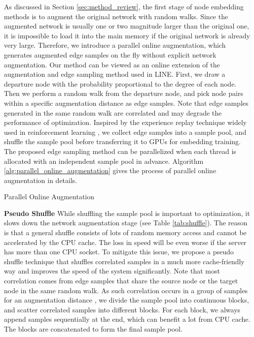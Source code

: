 \documentclass[sigconf]{acmart}
\begin{document}
As discussed in Section \ref{sec:method_review}, the first stage of node embedding methods is to augment the original network with random walks. Since the augmented network is usually one or two magnitude larger than the original one, it is impossible to load it into the main memory if the original network is already very large. Therefore, we introduce a parallel online augmentation, which generates augmented edge samples on the fly without explicit network augmentation. Our method can be viewed as an online extension of the augmentation and edge sampling method used in LINE\cite{tang2015line}. First, we draw a departure node with the probability proportional to the degree of each node. Then we perform a random walk from the departure node, and pick node pairs within a specific augmentation distance  as edge samples. Note that edge samples generated in the same random walk are correlated and may degrade the performance of optimization. Inspired by the experience replay technique widely used in reinforcement learning \cite{lin1993reinforcement, mnih2013playing}, we collect edge samples into a sample pool, and shuffle the sample pool before transferring it to GPUs for embedding training. The proposed edge sampling method can be parallelized when each thread is allocated with an independent sample pool in advance. Algorithm \ref{alg:parallel_online_augmentation} gives the process of parallel online augmentation in details.

\begin{algorithm}
    \caption{Parallel Online Augmentation}
    \begin{algorithmic}[1]
             
                \State{}
                    \State{}
                    \For{}
                        \If{}
                            \State{}
                        \EndIf
                    \EndFor
                \EndWhile
                \State{}
            \EndFor
            \State{\Return}
        \EndFunction
    \end{algorithmic}
    \label{alg:parallel_online_augmentation}
\end{algorithm}

\noindent \textbf{Pseudo Shuffle}
While shuffling the sample pool is important to optimization, it slows down the network augmentation stage (see Table \ref{tab:shuffle}). The reason is that a general shuffle consists of lots of random memory access and cannot be accelerated by the CPU cache. The loss in speed will be even worse if the server has more than one CPU socket. To mitigate this issue, we propose a pseudo shuffle technique that shuffles correlated samples in a much more cache-friendly way and improves the speed of the system significantly. Note that most correlation comes from edge samples that share the source node or the target node in the same random walk. As such correlation occurs in a group of  samples for an augmentation distance , we divide the sample pool into  continuous blocks, and scatter correlated samples into different blocks. For each block, we always append samples sequentially at the end, which can benefit a lot from CPU cache. The  blocks are concatenated to form the final sample pool.
\end{document}
